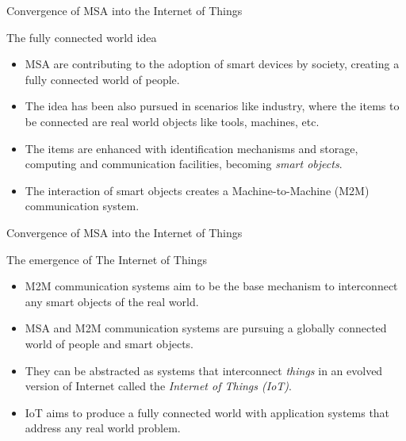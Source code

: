 \begin{frame}{Convergence of MSA into the Internet of Things}
  \begin{block}{The fully connected world idea}
    \begin{itemize}
      \item MSA are contributing to the adoption of smart devices by society, creating a fully connected world of people.
      \item The idea has been also pursued in scenarios like industry, where the items to be connected are real world objects like tools, machines, etc.
      \item The items are enhanced with identification mechanisms and storage, computing and communication facilities, becoming \emph{smart objects}.
      \item The interaction of smart objects creates a Machine-to-Machine (M2M) communication system.
    \end{itemize}
  \end{block}
\end{frame}

\begin{frame}{Convergence of MSA into the Internet of Things}
  \begin{block}{The emergence of The Internet of Things}
    \begin{itemize}
      \item M2M communication systems aim to be the base mechanism to interconnect any smart objects of the real world.
      \item MSA and M2M communication systems are pursuing a globally connected world of people and smart objects.
      \item They can be abstracted as systems that interconnect \emph{things} in an evolved version of Internet called the \emph{Internet of Things (IoT)}.
      \item IoT aims to produce a fully connected world with application systems that address any real world problem.
    \end{itemize}
  \end{block}
\end{frame}

